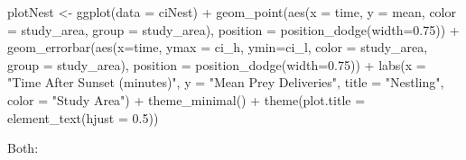 \documentclass[
]{article}
\newenvironment{Shaded}{\begin{snugshade}}{\end{snugshade}}
\newcommand{\AttributeTok}[1]{\textcolor[rgb]{0.77,0.63,0.00}{#1}}
\newcommand{\FloatTok}[1]{\textcolor[rgb]{0.00,0.00,0.81}{#1}}
\newcommand{\FunctionTok}[1]{\textcolor[rgb]{0.00,0.00,0.00}{#1}}
\newcommand{\NormalTok}[1]{#1}
\newcommand{\OtherTok}[1]{\textcolor[rgb]{0.56,0.35,0.01}{#1}}
\newcommand{\SpecialCharTok}[1]{\textcolor[rgb]{0.00,0.00,0.00}{#1}}
\newcommand{\StringTok}[1]{\textcolor[rgb]{0.31,0.60,0.02}{#1}}
\begin{document}
\begin{Shaded}
\begin{Highlighting}[]
\NormalTok{plotNest }\OtherTok{\textless{}{-}} \FunctionTok{ggplot}\NormalTok{(}\AttributeTok{data =}\NormalTok{ ciNest) }\SpecialCharTok{+}
  \FunctionTok{geom\_point}\NormalTok{(}\FunctionTok{aes}\NormalTok{(}\AttributeTok{x =}\NormalTok{ time, }\AttributeTok{y =}\NormalTok{ mean, }\AttributeTok{color =}\NormalTok{ study\_area, }\AttributeTok{group =}\NormalTok{ study\_area),}
             \AttributeTok{position =} \FunctionTok{position\_dodge}\NormalTok{(}\AttributeTok{width=}\FloatTok{0.75}\NormalTok{)) }\SpecialCharTok{+}
  \FunctionTok{geom\_errorbar}\NormalTok{(}\FunctionTok{aes}\NormalTok{(}\AttributeTok{x=}\NormalTok{time, }\AttributeTok{ymax =}\NormalTok{ ci\_h, }\AttributeTok{ymin=}\NormalTok{ci\_l, }\AttributeTok{color =}\NormalTok{ study\_area, }
                    \AttributeTok{group =}\NormalTok{ study\_area),}
                \AttributeTok{position =} \FunctionTok{position\_dodge}\NormalTok{(}\AttributeTok{width=}\FloatTok{0.75}\NormalTok{)) }\SpecialCharTok{+}
  \FunctionTok{labs}\NormalTok{(}\AttributeTok{x =} \StringTok{"Time After Sunset (minutes)"}\NormalTok{, }\AttributeTok{y =} \StringTok{"Mean Prey Deliveries"}\NormalTok{, }
       \AttributeTok{title =} \StringTok{"Nestling"}\NormalTok{, }\AttributeTok{color =} \StringTok{"Study Area"}\NormalTok{) }\SpecialCharTok{+}
  \FunctionTok{theme\_minimal}\NormalTok{() }\SpecialCharTok{+}
  \FunctionTok{theme}\NormalTok{(}\AttributeTok{plot.title =} \FunctionTok{element\_text}\NormalTok{(}\AttributeTok{hjust =} \FloatTok{0.5}\NormalTok{))}
\end{Highlighting}
\end{Shaded}

Both:
\end{document}
